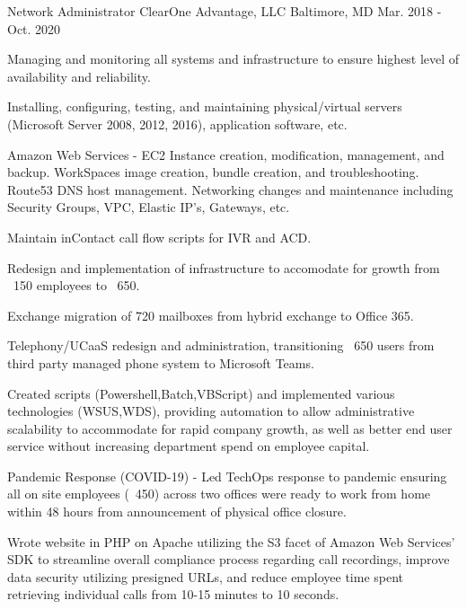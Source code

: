 \begin{cventries}
  \cventry
    {Network Administrator} %
    {ClearOne Advantage, LLC} %
    {Baltimore, MD} %
    {Mar. 2018 - Oct. 2020} %
    {
      \begin{cvitems} %
        \item {Managing and monitoring all systems and infrastructure to ensure highest level of availability and reliability.}
        \item {Installing, configuring, testing, and maintaining physical/virtual servers (Microsoft Server 2008, 2012, 2016), application software, etc.}
        \item {Amazon Web Services - EC2 Instance creation, modification, management, and backup. WorkSpaces image creation, bundle creation, and troubleshooting. Route53 DNS host management. Networking changes and maintenance including Security Groups, VPC, Elastic IP's, Gateways, etc.}
        \item {Maintain inContact call flow scripts for IVR and ACD.}
        \item {Redesign and implementation of infrastructure to accomodate for growth from ~150 employees to ~650.}
        \item {Exchange migration of 720 mailboxes from hybrid exchange to Office 365.}
        \item {Telephony/UCaaS redesign and administration, transitioning ~650 users from third party managed phone system to Microsoft Teams.}
        \item {Created scripts (Powershell,Batch,VBScript) and implemented various technologies (WSUS,WDS), providing automation to allow administrative scalability to accommodate for rapid company growth, as well as better end user service without increasing department spend on employee capital.}
        \item {Pandemic Response (COVID-19) - Led TechOps response to pandemic ensuring all on site employees (~450) across two offices were ready to work from home within 48 hours from announcement of physical office closure.}
        \item{Wrote website in PHP on Apache utilizing the S3 facet of Amazon Web Services’ SDK to streamline overall compliance process regarding call recordings, improve data security utilizing presigned URLs, and reduce employee time spent retrieving individual calls from 10-15 minutes to 10 seconds.}
      \end{cvitems}
    }


\end{cventries}
